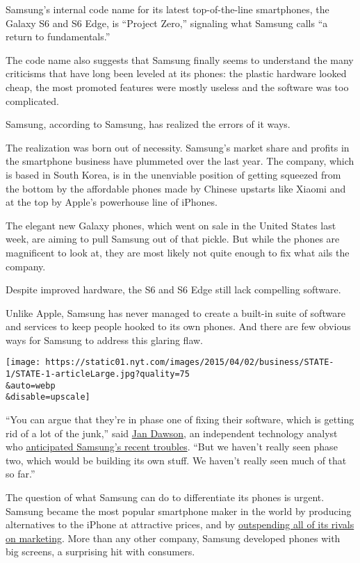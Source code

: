 Samsung's internal code name for its latest top-of-the-line smartphones,
the Galaxy S6 and S6 Edge, is ``Project Zero,'' signaling what Samsung
calls ``a return to fundamentals.''

The code name also suggests that Samsung finally seems to understand the
many criticisms that have long been leveled at its phones: the plastic
hardware looked cheap, the most promoted features were mostly useless
and the software was too complicated.

Samsung, according to Samsung, has realized the errors of it ways.

The realization was born out of necessity. Samsung's market share and
profits in the smartphone business have plummeted over the last year.
The company, which is based in South Korea, is in the unenviable
position of getting squeezed from the bottom by the affordable phones
made by Chinese upstarts like Xiaomi and at the top by Apple's
powerhouse line of iPhones.

The elegant new Galaxy phones, which went on sale in the United States
last week, are aiming to pull Samsung out of that pickle. But while the
phones are magnificent to look at, they are most likely not quite enough
to fix what ails the company.

Despite improved hardware, the S6 and S6 Edge still lack compelling
software.

Unlike Apple, Samsung has never managed to create a built-in suite of
software and services to keep people hooked to its own phones. And there
are few obvious ways for Samsung to address this glaring flaw.

\texttt{[image: https://static01.nyt.com/images/2015/04/02/business/STATE-1/STATE-1-articleLarge.jpg?quality=75\\\&auto=webp\\\&disable=upscale]}

``You can argue that they're in phase one of fixing their software,
which is getting rid of a lot of the junk,'' said
\href{http://www.beyonddevic.es/}{Jan Dawson}, an independent technology
analyst who
\href{https://techpinions.com/is-samsungs-exceptionalism-coming-to-an-end/32325}{anticipated
Samsung's recent troubles}. ``But we haven't really seen phase two,
which would be building its own stuff. We haven't really seen much of
that so far.''

The question of what Samsung can do to differentiate its phones is
urgent. Samsung became the most popular smartphone maker in the world by
producing alternatives to the iPhone at attractive prices, and by
\href{http://www.businessinsider.com/chart-of-the-day-samsung-marketing-budget-2013-6}{outspending
all of its rivals on marketing}. More than any other company, Samsung
developed phones with big screens, a surprising hit with consumers.

